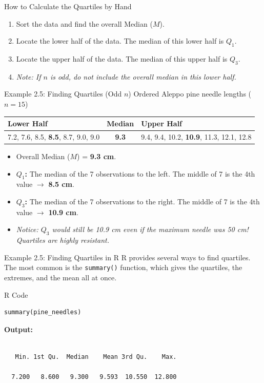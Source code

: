 \documentclass[aspectratio=169]{beamer}
\begin{document}
\begin{frame}{How to Calculate the Quartiles by Hand}
\begin{enumerate}
	\item Sort the data and find the overall Median ($M$).
	\item Locate the lower half of the data. The median of this lower half is $Q_1$.
	\item Locate the upper half of the data. The median of this upper half is $Q_3$.
	\item \emph{Note: If $n$ is odd, do not include the overall median in this lower half.}
\end{enumerate}
\end{frame}

\begin{frame}{Example 2.5: Finding Quartiles (Odd $n$)}
Ordered Aleppo pine needle lengths ($n=15$)
\vspace{0.2cm}
\begin{table}
\centering
\small
\begin{tabular}{p{4cm}cp{4cm}}
\toprule
\textbf{Lower Half} & \textbf{Median} & \textbf{Upper Half} \\
\midrule
7.2, 7.6, 8.5, \textbf{8.5}, 8.7, 9.0, 9.0 & \textbf{9.3} & 9.4, 9.4, 10.2, \textbf{10.9}, 11.3, 12.1, 12.8 \\
\bottomrule
\end{tabular}
\end{table}
\begin{itemize}
	\item Overall Median ($M$) = \textbf{9.3 cm}.
	\item \textbf{$Q_1$:} The median of the 7 observations to the left. The middle of 7 is the 4th value $\rightarrow$ \textbf{8.5 cm}.
	\item \textbf{$Q_3$:} The median of the 7 observations to the right. The middle of 7 is the 4th value $\rightarrow$ \textbf{10.9 cm}.
	\item \emph{Notice: $Q_3$ would still be 10.9 cm even if the maximum needle was 50 cm! Quartiles are highly resistant.}
\end{itemize}
\end{frame}


\begin{frame}[fragile]{Example 2.5: Finding Quartiles in R}
R provides several ways to find quartiles. The most common is the \texttt{summary()} function, which gives the quartiles, the extremes, and the mean all at once.
\vspace{0.3cm}
\begin{block}{R Code}
\begin{verbatim}
summary(pine_needles)
\end{verbatim}
\end{block}
\textbf{Output:}
\begin{verbatim}

   Min. 1st Qu.  Median    Mean 3rd Qu.    Max. 

  7.200   8.600   9.300   9.593  10.550  12.800 

 \end{verbatim}
\end{frame}
\end{document}
